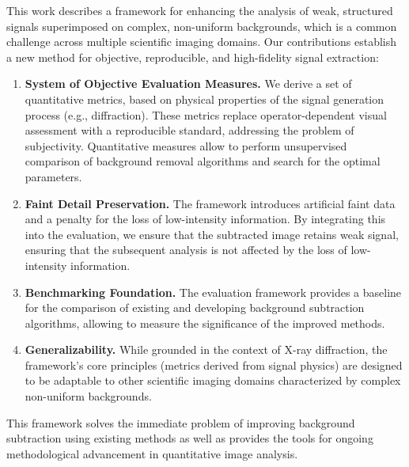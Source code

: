 \documentclass[iucr,review]{iucrjournals}
\begin{document}
This work describes a framework for enhancing the analysis of weak, structured signals superimposed on complex, non-uniform backgrounds, 
which is a common challenge across multiple scientific imaging domains. 
Our contributions establish a new method for objective, reproducible, and high-fidelity signal extraction:
\begin{enumerate}
        \item \textbf{System of Objective Evaluation Measures.} We derive a set of quantitative metrics,
        based on physical properties of the signal generation process (e.g., diffraction).
        These metrics replace operator-dependent visual assessment with a reproducible standard,
        addressing the problem of subjectivity.
        Quantitative measures allow to perform unsupervised
        comparison of background removal algorithms and search for the optimal parameters. 
        \item \textbf{Faint Detail Preservation.} The framework introduces artificial faint data and a penalty for the loss
        of low-intensity information. By integrating this into the evaluation,
        we ensure that the subtracted image retains weak signal,
        ensuring that the subsequent analysis is not affected by the loss of low-intensity information.
        \item \textbf{Benchmarking Foundation.} The evaluation
        framework provides a baseline for the comparison
        of existing and developing
        background subtraction algorithms,
        allowing to measure the significance of the improved methods. 
        \item \textbf{Generalizability.} While grounded in the context of X-ray diffraction, the framework's
        core principles (metrics derived from signal physics)
        are designed to be adaptable to other scientific imaging domains characterized by complex non-uniform backgrounds. 
\end{enumerate}

This framework solves the immediate problem of improving background subtraction using existing methods as well as provides
the tools for ongoing methodological advancement
in quantitative image analysis.

\end{document}
